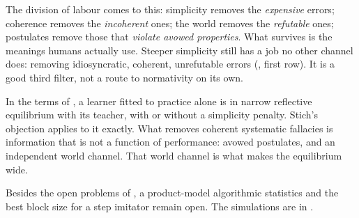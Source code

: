 The division of labour comes to this: simplicity removes the \emph{expensive} errors; coherence removes the \emph{incoherent} ones; the world removes the \emph{refutable} ones; postulates remove those that \emph{violate avowed properties}. What survives is the meanings humans actually use. Steeper simplicity still has a job no other channel does: removing idiosyncratic, coherent, unrefutable errors (, first row). It is a good third filter, not a route to normativity on its own.

In the terms of , a learner fitted to practice alone is in narrow reflective equilibrium with its teacher, with or without a simplicity penalty. Stich's objection applies to it exactly. What removes coherent systematic fallacies is information that is not a function of performance: avowed postulates, and an independent world channel. That world channel is what makes the equilibrium wide.

Besides the open problems of , a product-model algorithmic statistics and the best block size for a step imitator remain open. The simulations are in .
